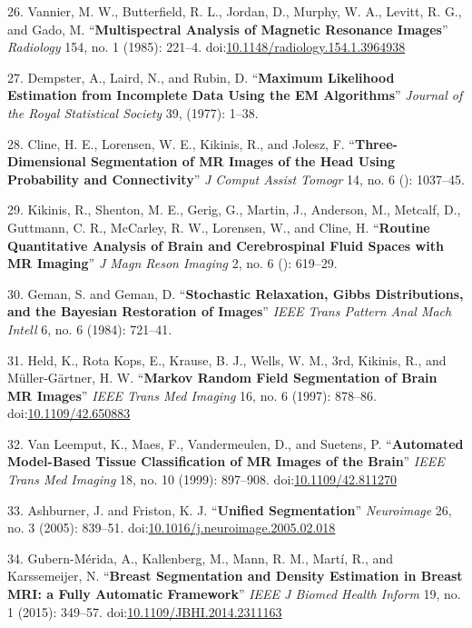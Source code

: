 \documentclass[11pt,]{article}
\begin{document}
26. Vannier, M. W., Butterfield, R. L., Jordan, D., Murphy, W. A.,
Levitt, R. G., and Gado, M. ``\textbf{Multispectral Analysis of Magnetic
Resonance Images}'' \emph{Radiology} 154, no. 1 (1985): 221--4.
doi:\href{http://dx.doi.org/10.1148/radiology.154.1.3964938}{10.1148/radiology.154.1.3964938}

27. Dempster, A., Laird, N., and Rubin, D. ``\textbf{Maximum Likelihood
Estimation from Incomplete Data Using the EM Algorithms}'' \emph{Journal
of the Royal Statistical Society} 39, (1977): 1--38.

28. Cline, H. E., Lorensen, W. E., Kikinis, R., and Jolesz, F.
``\textbf{Three-Dimensional Segmentation of MR Images of the Head Using
Probability and Connectivity}'' \emph{J Comput Assist Tomogr} 14, no. 6
(): 1037--45.

29. Kikinis, R., Shenton, M. E., Gerig, G., Martin, J., Anderson, M.,
Metcalf, D., Guttmann, C. R., McCarley, R. W., Lorensen, W., and Cline,
H. ``\textbf{Routine Quantitative Analysis of Brain and Cerebrospinal
Fluid Spaces with MR Imaging}'' \emph{J Magn Reson Imaging} 2, no. 6 ():
619--29.

30. Geman, S. and Geman, D. ``\textbf{Stochastic Relaxation, Gibbs
Distributions, and the Bayesian Restoration of Images}'' \emph{IEEE
Trans Pattern Anal Mach Intell} 6, no. 6 (1984): 721--41.

31. Held, K., Rota Kops, E., Krause, B. J., Wells, W. M., 3rd, Kikinis,
R., and M{ü}ller-G{ä}rtner, H. W. ``\textbf{Markov Random Field
Segmentation of Brain MR Images}'' \emph{IEEE Trans Med Imaging} 16, no.
6 (1997): 878--86.
doi:\href{http://dx.doi.org/10.1109/42.650883}{10.1109/42.650883}

32. Van Leemput, K., Maes, F., Vandermeulen, D., and Suetens, P.
``\textbf{Automated Model-Based Tissue Classification of MR Images of
the Brain}'' \emph{IEEE Trans Med Imaging} 18, no. 10 (1999): 897--908.
doi:\href{http://dx.doi.org/10.1109/42.811270}{10.1109/42.811270}

33. Ashburner, J. and Friston, K. J. ``\textbf{Unified Segmentation}''
\emph{Neuroimage} 26, no. 3 (2005): 839--51.
doi:\href{http://dx.doi.org/10.1016/j.neuroimage.2005.02.018}{10.1016/j.neuroimage.2005.02.018}

34. Gubern-M{é}rida, A., Kallenberg, M., Mann, R. M., Mart{í}, R., and
Karssemeijer, N. ``\textbf{Breast Segmentation and Density Estimation in
Breast MRI: a Fully Automatic Framework}'' \emph{IEEE J Biomed Health
Inform} 19, no. 1 (2015): 349--57.
doi:\href{http://dx.doi.org/10.1109/JBHI.2014.2311163}{10.1109/JBHI.2014.2311163}
\end{document}
